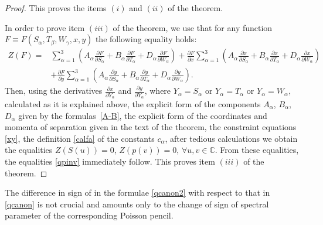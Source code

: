 \documentclass[pdftex]{sigma}
\def\a{\alpha}
\def\b{\beta}
\def\g{\gamma}
\numberwithin{equation}{section}
\begin{document}
\begin{proof}
 This proves the items $(i)$ and $(ii)$ of the theorem.


In order to prove item $(iii)$ of the theorem, we use that for any function $F\equiv F(S_{\a}, T_{\b}, W_{\g},\allowbreak x,y)$ the following equality holds:
\begin{align*}
Z(F)={}& \sum\limits_{\a=1}^3\left( A_{\a}\frac{\partial F}{ \partial S_{\a}}+
B_{\a}\frac{\partial F}{ \partial T_{\a}}+ D_{\a}\frac{\partial F}{ \partial W_{\a}}\right) + \frac{\partial F}{ \partial x}\sum\limits_{\a=1}^3\left( A_{\a}\frac{\partial x}{ \partial S_{\a}}+
B_{\a}\frac{\partial x}{ \partial T_{\a}}+ D_{\a}\frac{\partial x}{ \partial W_{\a}}\right)
\\
&+
\frac{\partial F}{ \partial y} \sum\limits_{\a=1}^3\left( A_{\a}\frac{\partial y}{ \partial S_{\a}}+
B_{\a}\frac{\partial y}{ \partial T_{\a}}+ D_{\a}\frac{\partial y}{ \partial W_{\a}}\right).
\end{align*}
Then, using the derivatives $\frac{\partial x}{\partial Y_{ \a}}$ and $\frac{\partial y}{\partial Y_{ \a}}$, where $Y_{\a}=S_{\a}$ or $Y_{\a}=T_{\a}$ or $Y_{\a}=W_{\a}$, calculated as it is explained above, the explicit form of the components $A_{\a}$, $B_{\a}$, $D_{\a}$ given by the formulas~\eqref{A-B}, the explicit form of the coordinates and momenta of separation given in the text of the theorem, the constraint equations \eqref{xy}, the definition \eqref{calfa} of the constants $c_{\a}$, after tedious calculations we obtain the equalities
$
Z(S(u))=0$, $ Z(p(v))=0$, $ \forall u,v \in \mathbb{C}$.
From these equalities, the equalities \eqref{qpinv} immediately follow.
This proves item $(iii)$ of the theorem.
\end{proof}

\begin{Remark}

 The difference in sign of in the formulae \eqref{qcanon2} with respect to that in \eqref{qcanon} is not crucial and amounts only to the change of sign of spectral parameter of the corresponding Poisson pencil.
\end{Remark}
\end{document}
